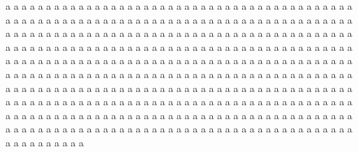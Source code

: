 
\physics

\begin{paperabs}
	
	a a a a a a a a a a a a a a a a a a a a a a a a a a a a a a a a a a a a a a a a a a a a a a a a a a a a a a a a a a a a a a a a a a a a a a a a a a a a a a a a a a a a a a a a a a a a a a a a a a a a a a a a a a a a a a a a a a a a a a a a a a a a a a a a a a a a a a a a a a a a a a a a a a a a a a a a a a a a a a a a a a a a a a a a a a a a a a a a a a a a a a a a a a a a a a a a a a a a a a a a a a a a a a a a a a a a a a a a a a a a a a a a a a a a a a a a a a a a a a a a a a a a a a a a a a a a a a a a a a a a a a a a a a a a a a a a a a a a a a a a a a a a a a a a a a a a a a a a a a a a a a a a a a a a a a a a a a a a a a a a a a a a a a a a a a a a a a a a a a a a a a a a a a a a a a a a a a a a a a a a a a a a a a a a a a a a a a a a a a a a a a a a a a a a a a a a a a a a a a a a a a a a a a a a a a a a a a a a a a a a a a a a a a a a a a a a a a a a a a a a
	
\end{paperabs}

